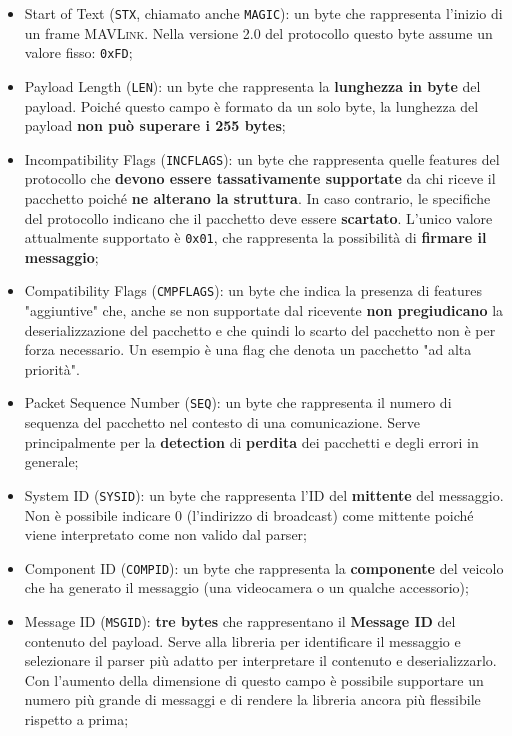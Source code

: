 \documentclass[a4paper, 12pt, oneside]{article}
\theoremstyle{definition}
\begin{document}
\begin{itemize}
    \item Start of Text (\texttt{STX}, chiamato anche \texttt{MAGIC}): un byte che rappresenta l'inizio di un frame \textsc{MAVLink}. Nella versione 2.0 del protocollo questo byte assume un valore fisso: \texttt{0xFD};
    \item Payload Length (\texttt{LEN}): un byte che rappresenta la \textbf{lunghezza in byte} del payload. Poiché questo campo è formato da un solo byte, la lunghezza del payload \textbf{non può superare i 255 bytes};
    \item Incompatibility Flags (\texttt{INCFLAGS}): un byte che rappresenta quelle features del protocollo che \textbf{devono essere tassativamente supportate} da chi riceve il pacchetto poiché \textbf{ne alterano la struttura}. In caso contrario, le specifiche del protocollo indicano che il pacchetto deve essere \textbf{scartato}. L'unico valore attualmente supportato è \texttt{0x01}, che rappresenta la possibilità di \textbf{firmare il messaggio};
    \item Compatibility Flags (\texttt{CMPFLAGS}): un byte che indica la presenza di features "aggiuntive" che, anche se non supportate dal ricevente \textbf{non pregiudicano} la deserializzazione del pacchetto e che quindi lo scarto del pacchetto non è per forza necessario. Un esempio è una flag che denota un pacchetto "ad alta priorità".
    \item Packet Sequence Number (\texttt{SEQ}): un byte che rappresenta il numero di sequenza del pacchetto nel contesto di una comunicazione. Serve principalmente per la \textbf{detection} di \textbf{perdita} dei pacchetti e degli errori in generale;
    \item System ID (\texttt{SYSID}): un byte che rappresenta l'ID del \textbf{mittente} del messaggio. Non è possibile indicare 0 (l'indirizzo di broadcast) come mittente poiché viene interpretato come non valido dal parser;
    \item Component ID (\texttt{COMPID}): un byte che rappresenta la \textbf{componente} del veicolo che ha generato il messaggio (una videocamera o un qualche accessorio);
    \item Message ID (\texttt{MSGID}): \textbf{tre bytes} che rappresentano il \textbf{Message ID} del contenuto del payload. Serve alla libreria per identificare il messaggio e selezionare il parser più adatto per interpretare il contenuto e deserializzarlo. Con l'aumento della dimensione di questo campo è possibile supportare un numero più grande di messaggi e di rendere la libreria ancora più flessibile rispetto a prima;

\end{itemize}
\end{document}
